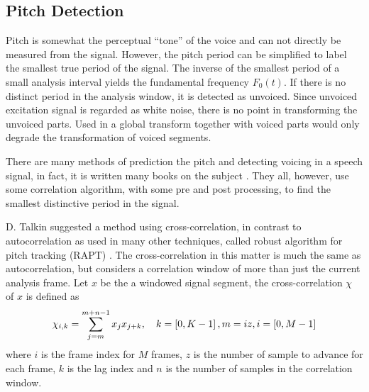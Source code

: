 \subsection{Pitch Detection} %
\label{sub:pitch_detection}
Pitch is somewhat the perceptual ``tone'' of the voice and can not directly be measured from the signal. However, the pitch period can be simplified to label the smallest true period of the signal. The inverse of the smallest period of a small analysis interval yields the fundamental frequency $F_0(t)$. If there is no distinct period in the analysis window, it is detected as unvoiced.
Since unvoiced excitation signal is regarded as white noise, there is no point in transforming the unvoiced parts. Used in a global transform together with voiced parts would only degrade the transformation of voiced segments.

There are many methods of prediction the pitch and detecting voicing in a speech signal, in fact, it is written many books on the subject \cite{kleijn95}. They all, however, use some correlation algorithm, with some pre and post processing, to find the smallest distinctive period in the signal.

D. Talkin suggested a method using cross-correlation, in contrast to autocorrelation as used in many other techniques, called robust algorithm for pitch tracking (RAPT) \cite{talkin95}. The cross-correlation in this matter is much the same as autocorrelation, but considers a correlation window of more than just the current analysis frame. Let $x$ be the a windowed signal segment, the cross-correlation $\chi$ of $x$ is defined as
\begin{equation}
	\chi_{i,k} = \sum_{j=m}^{m+n-1}x_j x_{j+k}, \quad k=\left[0,K-1\right],m=iz,i=\left[0,M-1\right]
\end{equation}
where $i$ is the frame index for $M$ frames, $z$ is the number of sample to advance for each frame, $k$ is the lag index and $n$ is the number of samples in the correlation window.

